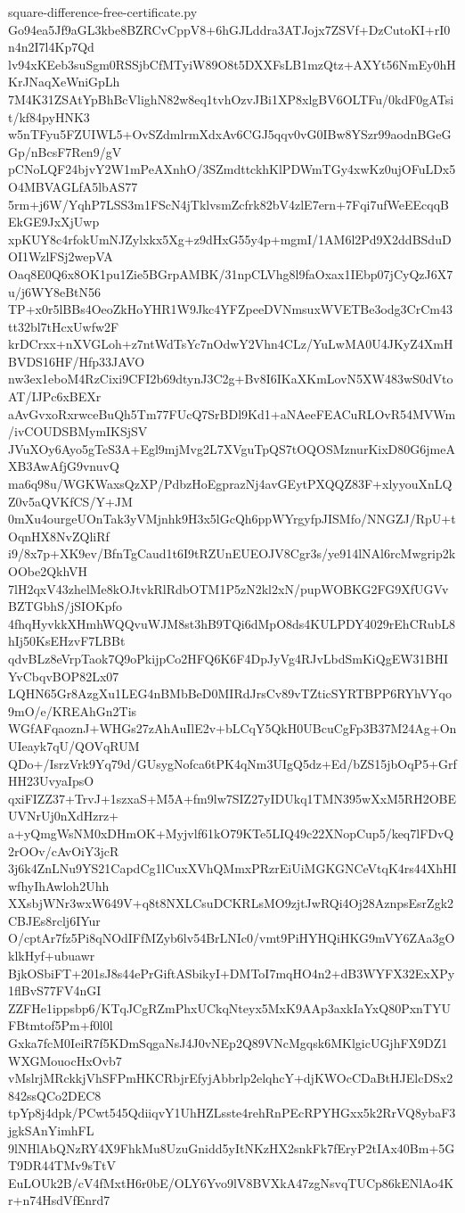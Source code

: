 \documentclass[11pt]{article}
\theoremstyle{definition}
\theoremstyle{remark}
\begin{document}
\begin{filecontents*}[overwrite]{square-difference-free-certificate.py}
Go94ea5Jf9aGL3kbe8BZRCvCppV8+6hGJLddra3ATJojx7ZSVf+DzCutoKI+rI0n4n2I7l4Kp7Qd
lv94xKEeb3suSgm0RSSjbCfMTyiW89O8t5DXXFsLB1mzQtz+AXYt56NmEy0hHKrJNaqXeWniGpLh
7M4K31ZSAtYpBhBcVlighN82w8eq1tvhOzvJBi1XP8xlgBV6OLTFu/0kdF0gATsit/kf84pyHNK3
w5nTFyu5FZUIWL5+OvSZdmlrmXdxAv6CGJ5qqv0vG0IBw8YSzr99aodnBGeGGp/nBcsF7Ren9/gV
pCNoLQF24bjvY2W1mPeAXnhO/3SZmdttckhKlPDWmTGy4xwKz0ujOFuLDx5O4MBVAGLfA5lbAS77
5rm+j6W/YqhP7LSS3m1FScN4jTklvsmZcfrk82bV4zlE7ern+7Fqi7ufWeEEcqqBEkGE9JxXjUwp
xpKUY8c4rfokUmNJZylxkx5Xg+z9dHxG55y4p+mgmI/1AM6l2Pd9X2ddBSduDOI1WzlFSj2wepVA
Oaq8E0Q6x8OK1pu1Zie5BGrpAMBK/31npCLVhg8l9faOxax1IEbp07jCyQzJ6X7u/j6WY8eBtN56
TP+x0r5lBBs4OeoZkHoYHR1W9Jkc4YFZpeeDVNmsuxWVETBe3odg3CrCm43tt32bl7tHcxUwfw2F
krDCrxx+nXVGLoh+z7ntWdTsYc7nOdwY2Vhn4CLz/YuLwMA0U4JKyZ4XmHBVDS16HF/Hfp33JAVO
nw3ex1eboM4RzCixi9CFI2b69dtynJ3C2g+Bv8I6IKaXKmLovN5XW483wS0dVtoAT/IJPc6xBEXr
aAvGvxoRxrwceBuQh5Tm77FUcQ7SrBDl9Kd1+aNAeeFEACuRLOvR54MVWm/ivCOUDSBMymIKSjSV
JVuXOy6Ayo5gTeS3A+Egl9mjMvg2L7XVguTpQS7tOQOSMznurKixD80G6jmeAXB3AwAfjG9vnuvQ
ma6q98u/WGKWaxsQzXP/PdbzHoEgprazNj4avGEytPXQQZ83F+xlyyouXnLQZ0v5aQVKfCS/Y+JM
0mXu4ourgeUOnTak3yVMjnhk9H3x5lGcQh6ppWYrgyfpJISMfo/NNGZJ/RpU+tOqnHX8NvZQliRf
i9/8x7p+XK9ev/BfnTgCaud1t6I9tRZUnEUEOJV8Cgr3s/ye914lNAl6rcMwgrip2kOObe2QkhVH
7lH2qxV43zhelMe8kOJtvkRlRdbOTM1P5zN2kl2xN/pupWOBKG2FG9XfUGVvBZTGbhS/jSIOKpfo
4fhqHyvkkXHmhWQQvuWJM8st3hB9TQi6dMpO8ds4KULPDY4029rEhCRubL8hIj50KsEHzvF7LBBt
qdvBLz8eVrpTaok7Q9oPkijpCo2HFQ6K6F4DpJyVg4RJvLbdSmKiQgEW31BHIYvCbqvBOP82Lx07
LQHN65Gr8AzgXu1LEG4nBMbBeD0MIRdJrsCv89vTZticSYRTBPP6RYhVYqo9mO/e/KREAhGn2Tis
WGfAFqaoznJ+WHGs27zAhAuIlE2v+bLCqY5QkH0UBcuCgFp3B37M24Ag+OnUIeayk7qU/QOVqRUM
QDo+/IsrzVrk9Yq79d/GUsygNofca6tPK4qNm3UIgQ5dz+Ed/bZS15jbOqP5+GrfHH23UvyaIpsO
qxiFIZZ37+TrvJ+1szxaS+M5A+fm9lw7SIZ27yIDUkq1TMN395wXxM5RH2OBEUVNrUj0nXdHzrz+
a+yQmgWsNM0xDHmOK+Myjvlf61kO79KTe5LIQ49c22XNopCup5/keq7lFDvQ2rOOv/cAvOiY3jcR
3j6k4ZnLNu9YS21CapdCg1lCuxXVhQMmxPRzrEiUiMGKGNCeVtqK4rs44XhHIwfhyIhAwloh2Uhh
XXsbjWNr3wxW649V+q8t8NXLCsuDCKRLsMO9zjtJwRQi4Oj28AznpsEsrZgk2CBJEs8rclj6IYur
O/cptAr7fz5Pi8qNOdIFfMZyb6lv54BrLNIc0/vmt9PiHYHQiHKG9mVY6ZAa3gOklkHyf+ubuawr
BjkOSbiFT+201sJ8s44ePrGiftASbikyI+DMToI7mqHO4n2+dB3WYFX32ExXPy1flBvS77FV4nGI
ZZFHe1ippsbp6/KTqJCgRZmPhxUCkqNteyx5MxK9AAp3axkIaYxQ80PxnTYUFBtmtof5Pm+f0l0l
Gxka7fcM0IeiR7f5KDmSqgaNsJ4J0vNEp2Q89VNcMgqsk6MKlgicUGjhFX9DZ1WXGMouocHxOvb7
vMslrjMRckkjVhSFPmHKCRbjrEfyjAbbrlp2elqhcY+djKWOcCDaBtHJElcDSx2842ssQCo2DEC8
tpYp8j4dpk/PCwt545QdiiqvY1UhHZLsste4rehRnPEcRPYHGxx5k2RrVQ8ybaF3jgkSAnYimhFL
9lNHlAbQNzRY4X9FhkMu8UzuGnidd5yItNKzHX2snkFk7fEryP2tIAx40Bm+5GT9DR44TMv9sTtV
EuLOUk2B/cV4fMxtH6r0bE/OLY6Yvo9lV8BVXkA47zgNsvqTUCp86kENlAo4Kr+n74HsdVfEnrd7

\end{filecontents*}
\end{document}
